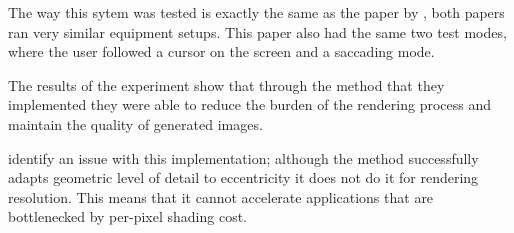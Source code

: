 The way this sytem was tested is exactly the same as the paper by \cite{Levoy}, both papers ran very similar equipment setups. This paper also had the same two test modes, where the user followed a cursor on the screen and a saccading mode. 

The results of the experiment show that through the method that they implemented they were able to reduce the burden of the rendering process and maintain the quality of generated images.

\cite{Guenter:2012:FG:2366145.2366183} identify an issue with this implementation; although the method successfully adapts geometric level of detail to eccentricity it does not do it for rendering resolution. This means that it cannot accelerate applications that are bottlenecked by per-pixel shading cost.
